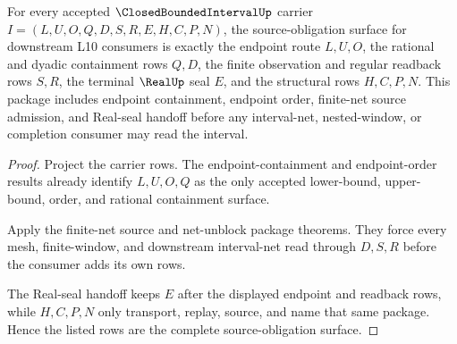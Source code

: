 \begin{theorem}
\label{thm:closed-bounded-interval-source-obligation-package}
For every accepted $\ClosedBoundedIntervalUp$ carrier $I=(L,U,O,Q,D,S,R,E,H,C,P,N)$, the source-obligation surface for downstream L10 consumers is exactly the endpoint route $L,U,O$, the rational and dyadic containment rows $Q,D$, the finite observation and regular readback rows $S,R$, the terminal $\RealUp$ seal $E$, and the structural rows $H,C,P,N$. This package includes endpoint containment, endpoint order, finite-net source admission, and Real-seal handoff before any interval-net, nested-window, or completion consumer may read the interval.
\end{theorem}
\begin{proof}
Project the carrier rows. The endpoint-containment and endpoint-order results already identify $L,U,O,Q$ as the only accepted lower-bound, upper-bound, order, and rational containment surface.

Apply the finite-net source and net-unblock package theorems. They force every mesh, finite-window, and downstream interval-net read through $D,S,R$ before the consumer adds its own rows.

The Real-seal handoff keeps $E$ after the displayed endpoint and readback rows, while $H,C,P,N$ only transport, replay, source, and name that same package. Hence the listed rows are the complete source-obligation surface.
\end{proof}

